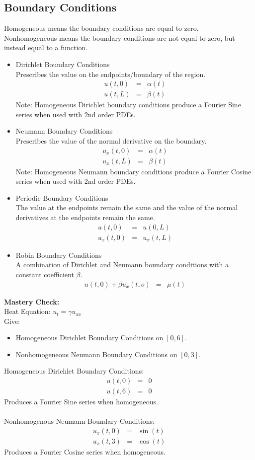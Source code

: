 \documentclass{article}
\newcommand{\bea}{\begin{eqnarray*}}
\newcommand{\eea}{\end{eqnarray*}}
\begin{document}
\subsection{Boundary Conditions}
Homogeneous means the boundary conditions are equal to zero.\\
Nonhomogeneous means the boundary conditions are not equal to zero, but instead equal to a function.
\begin{itemize}
\item Dirichlet Boundary Conditions\\
Prescribes the value on the endpoints/boundary of the region.
\bea
u(t,0) &=& \alpha(t)\\
u(t,L) &=& \beta(t)
\eea
Note: Homogeneous Dirichlet boundary conditions produce a Fourier Sine series when used with $2$nd order PDEs.
\item Neumann Boundary Conditions\\
Prescribes the value of the normal derivative on the boundary.
\bea
u_x(t,0) &=& \alpha(t)\\
u_x(t,L) &=& \beta(t)
\eea
Note: Homogeneous Neumann boundary conditions produce a Fourier Cosine series when used with $2$nd order PDEs.
\item Periodic Boundary Conditions\\
The value at the endpoints remain the same and the value of the normal derivatives at the endpoints remain the same.
\bea
u(t,0) &=& u(0,L)\\
u_x(t,0) &=& u_x(t,L)
\eea
\item Robin Boundary Conditions\\
A combination of Dirichlet and Neumann boundary conditions with a constant coefficient $\beta$.
\bea
u(t,0) + \beta u_x(t,o) &=& \mu(t)
\eea
\end{itemize}
\textbf{Mastery Check:}\\
Heat Equation: $u_t = \gamma u_{xx}$\\
Give:
\begin{itemize}
\item Homogeneous Dirichlet Boundary Conditions on $[0,6]$.
\item Nonhomogeneous Neumann Boundary Conditions on $[0,3]$.\\
\end{itemize}
Homogeneous Dirichlet Boundary Conditions:\\
\bea
u(t,0) &=& 0\\
u(t,6) &=& 0
\eea
Produces a Fourier Sine series when homogeneous.\\\\
Nonhomogenous Neumann Boundary Conditions:\\
\bea
u_x(t,0) &=& \sin(t)\\
u_x(t,3) &=& \cos(t)
\eea
Produces a Fourier Cosine series when homogeneous.
\end{document}

